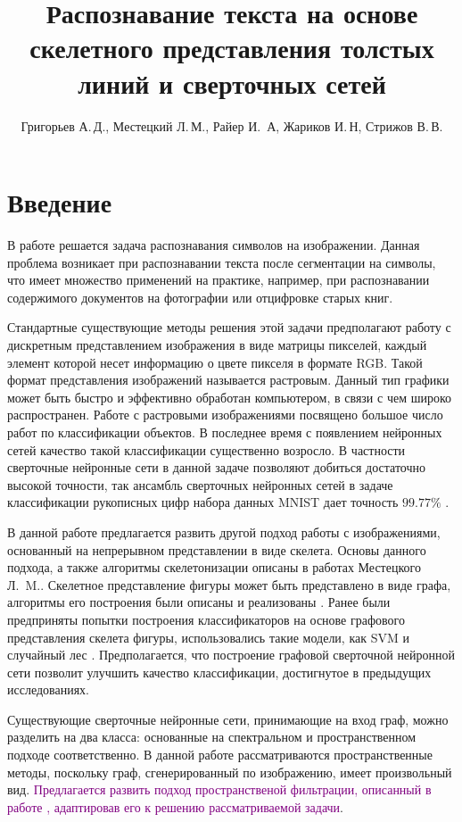 \documentclass[12pt,twoside]{article}
\title
    [Распознавание текста на основе скелетного представления толстых линий и сверточных сетей] 
    {Распознавание текста на основе скелетного представления толстых линий и сверточных сетей}
\author
    [Григорьев А.\,Д., Местецкий Л.\,М., Райер И.\, А, Жариков И.\,Н, Стрижов В.\,В.] 
    {Григорьев А.\,Д., Местецкий Л.\,М., Райер И.\, А, Жариков И.\,Н, Стрижов В.\,В.}
    [Григорьев А.\,Д., Местецкий Л.\,М., Райер И.\, А, Жариков И.\,Н, Стрижов~В.\,В.]
\begin{document}
\maketitle
\section{Введение}
В работе решается задача распознавания символов на изображении. Данная проблема возникает при распознавании текста после сегментации на символы, что имеет множество применений на практике, например, при распознавании содержимого документов на фотографии или отцифровке старых книг.

Стандартные существующие методы решения этой задачи предполагают работу с дискретным представлением изображения в виде матрицы пикселей, каждый элемент которой несет информацию о цвете пикселя в формате RGB.  Такой формат представления изображений называется растровым. Данный тип графики может быть быстро и эффективно обработан компьютером, в связи с чем широко распространен. Работе с растровыми изображениями посвящено большое число работ по классификации объектов. В последнее время с появлением нейронных сетей качество такой классификации существенно возросло. В частности сверточные нейронные сети в данной задаче позволяют добиться достаточно высокой точности, так ансамбль сверточных нейронных сетей в задаче классификации  рукописных цифр набора данных MNIST дает точность $99.77\%$ \cite{conf/icdar/CiresanMGS11}.

В данной работе предлагается развить другой подход работы с изображениями, основанный на непрерывном представлении в виде скелета. Основы данного подхода, а также алгоритмы скелетонизации описаны в работах Местецкого Л.~M.\cite{mest2009, mest2006, mest2008}. Скелетное представление фигуры может быть представлено в виде графа, алгоритмы его построения были описаны и реализованы \cite{journals/corr/Fujita15, journals/corr/DirnbergerNK15, skan_lib}. Ранее были предприняты попытки построения классификаторов на основе графового представления скелета фигуры, использовались такие модели, как SVM и случайный лес \cite{Svm_cush, rf_msu}. Предполагается, что построение графовой сверточной нейронной сети позволит улучшить качество классификации, достигнутое в предыдущих исследованиях.

Существующие сверточные нейронные сети, принимающие на вход граф, можно разделить на два класса: основанные на спектральном и пространственном подходе соответственно. В данной работе рассматриваются пространственные методы, поскольку граф, сгенерированный по изображению, имеет произвольный вид. \textcolor{purple}{Предлагается развить подход пространственой фильтрации, описанный в работе \cite{rsf}, адаптировав его к решению рассматриваемой задачи}.
\end{document}
